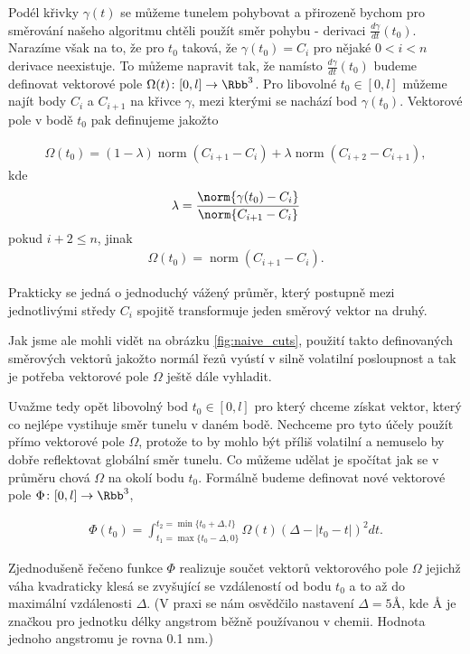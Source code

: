 Podél křivky $ \gamma(t) $ se můžeme tunelem pohybovat a přirozeně bychom pro
směrování našeho algoritmu chtěli použít směr pohybu - derivaci
$ \frac{d\gamma}{dt}(t_0) $. Narazíme však na to, že pro $ t_0 $ taková, že
$ \gamma(t_0) = C_i $ pro nějaké $ 0 < i < n $ derivace neexistuje. To můžeme
napravit tak, že namísto $ \frac{d\gamma}{dt}(t_0) $ budeme definovat vektorové
pole $ \Omega(t) \colon [0, l] \to \Rbb^3 $. Pro libovolné $ t_0 \in [0, l] $
můžeme najít body $ C_i $ a $ C_{i + 1} $ na křivce $ \gamma $, mezi kterými
se nachází bod $ \gamma(t_0) $. Vektorové pole v bodě $ t_0 $ pak definujeme
jakožto

\begin{align}
    \Omega(t_0) =
            (1 - \lambda) \operatorname{norm}(C_{i + 1} - C_i)
            +
            \lambda \operatorname{norm}(C_{i + 2} - C_{i + 1})
        ,
\end{align}
kde
\begin{align}
    \lambda = \frac{\norm{\gamma(t_0) - C_i}}{\norm{C_{i + 1} - C_i}}
\end{align}
pokud $ i + 2 \leq n $, jinak
\begin{align}
    \Omega(t_0) = \operatorname{norm}(C_{i + 1} - C_i).
\end{align}

Prakticky se jedná o jednoduchý vážený průměr, který postupně mezi jednotlivými středy
$ C_i $ spojitě transformuje jeden směrový vektor na druhý.

Jak jsme ale mohli vidět na obrázku \ref{fig:naive_cuts}, použití takto definovaných
směrových vektorů jakožto normál řezů vyústí v silně volatilní posloupnost
a tak je potřeba vektorové pole $ \Omega $ ještě dále vyhladit.

Uvažme tedy opět libovolný bod $ t_0 \in [0, l] $ pro který chceme získat vektor,
který co nejlépe vystihuje směr tunelu v daném bodě. Nechceme pro tyto účely použít
přímo vektorové pole $ \Omega $, protože to by mohlo být příliš volatilní
a nemuselo by dobře reflektovat globální směr tunelu. Co můžeme udělat je spočítat
jak se v průměru chová $ \Omega $ na okolí bodu $ t_0 $. Formálně budeme
definovat nové vektorové pole $ \Phi \colon [0, l] \to \Rbb^3 $,

\begin{align}
    \Phi(t_0) = \int_{t_1 = \max\{t_0 - \Delta, 0\}}^{t_2 = \min\{t_0 + \Delta, l\}}
        \Omega(t) (\Delta - \left| t_0 - t \right| )^2 dt.
\end{align}

Zjednodušeně řečeno funkce $ \Phi $ realizuje součet vektorů vektorového pole
$ \Omega $ jejichž váha kvadraticky klesá se zvyšující se vzdáleností od bodu
$ t_0 $ a to až do maximální vzdálenosti $ \Delta $. (V praxi se nám osvědčilo
nastavení $ \Delta = 5 Å $, kde Å je značkou pro jednotku délky angstrom běžně
používanou v chemii. Hodnota jednoho angstromu je rovna 0.1 nm.)


